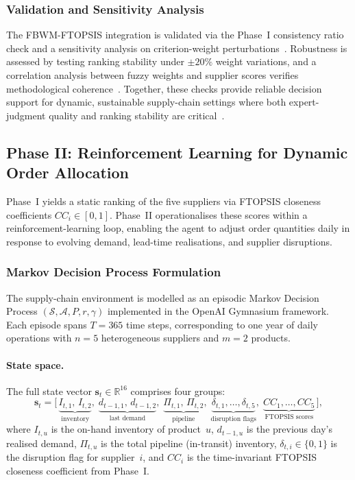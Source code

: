 \documentclass[preprint,12pt]{elsarticle}
\begin{document}
\subsubsection{Validation and Sensitivity Analysis}
The FBWM-FTOPSIS integration is validated via the Phase~I consistency ratio check and a sensitivity analysis on criterion-weight perturbations~\citep{raveena_umamaheswari_2025_pharma_supplier_mcdm,chen_etal_2021_fuzzy_topsis_supplier}.
Robustness is assessed by testing ranking stability under $\pm 20\%$ weight variations, and a correlation analysis between fuzzy weights and supplier scores verifies methodological coherence~\citep{rostami_etal_2023_gp_fbwm_viable_ss,liou_etal_2021_mcdm_datamining_green_supplier}.
Together, these checks provide reliable decision support for dynamic, sustainable supply-chain settings where both expert-judgment quality and ranking stability are critical~\citep{chaharsooghi_ashrafi_2014_neofuzzy_topsis,chen_etal_2021_fuzzy_topsis_supplier}.

\subsection{Phase II: Reinforcement Learning for Dynamic Order Allocation}
Phase~I yields a static ranking of the five suppliers via FTOPSIS closeness coefficients $CC_i \in [0,1]$. Phase~II operationalises these scores within a reinforcement-learning loop, enabling the agent to adjust order quantities daily in response to evolving demand, lead-time realisations, and supplier disruptions.

\subsubsection{Markov Decision Process Formulation}
The supply-chain environment is modelled as an episodic Markov Decision Process $(\mathcal{S},\mathcal{A},P,r,\gamma)$ implemented in the OpenAI Gymnasium framework. Each episode spans $T=365$ time steps, corresponding to one year of daily operations with $n=5$ heterogeneous suppliers and $m=2$ products.

\paragraph{State space.}
The full state vector $\mathbf{s}_t\in\mathbb{R}^{16}$ comprises four groups:
\begin{equation}
\mathbf{s}_t =
\bigl[\,
\underbrace{I_{t,1},\,I_{t,2}}_{\text{inventory}},\;
\underbrace{d_{t-1,1},\,d_{t-1,2}}_{\text{last demand}},\;
\underbrace{\Pi_{t,1},\,\Pi_{t,2}}_{\text{pipeline}},\;
\underbrace{\delta_{t,1},\ldots,\delta_{t,5}}_{\text{disruption flags}},\;
\underbrace{CC_1,\ldots,CC_5}_{\text{FTOPSIS scores}}
\,\bigr],
\label{eq:state}
\end{equation}
where $I_{t,u}$ is the on-hand inventory of product~$u$, $d_{t-1,u}$ is the previous day's realised demand, $\Pi_{t,u}$ is the total pipeline (in-transit) inventory, $\delta_{t,i}\in\{0,1\}$ is the disruption flag for supplier~$i$, and $CC_i$ is the time-invariant FTOPSIS closeness coefficient from Phase~I.
\end{document}
